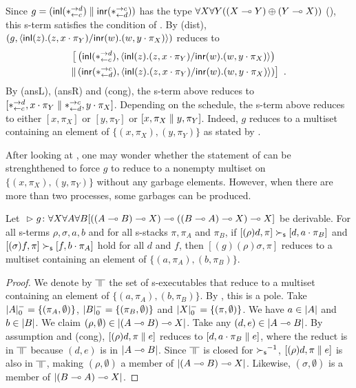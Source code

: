 \begin{example}
 \label{spec-ex}
 Since $g = (\mathsf{inl}({\ast^{\rightarrow {d}}_{\leftarrow{c}}})\parallel\mathsf{inr}({\ast^{\rightarrow {c}}_{\leftarrow{d}}}))$ has the type
 $\forall X\forall Y((X\multimap Y)\oplus (Y\multimap X))$ (),
 this s-term satisfies the condition of .
 By (dist),
 $\left(g, \langle \mathsf{inl}({z}). ({z},{x\cdot\pi_Y})/ \mathsf{inr}({w}). ({w},{y\cdot\pi_X})\rangle\right)$
 reduces to
 \begin{align*}
  \bigl[& \left(\mathsf{inl}({\ast^{\rightarrow {d}}_{\leftarrow{c}}}),
  \langle \mathsf{inl}({z}). ({z},{x\cdot\pi_Y})/ \mathsf{inr}({w}). ({w},{y\cdot\pi_X})\rangle\right) \\ \parallel
  & \left(\mathsf{inr}({\ast^{\rightarrow {c}}_{\leftarrow{d}}}), \langle \mathsf{inl}({z}). ({z},{x\cdot\pi_Y})/ \mathsf{inr}({w}). ({w},{y\cdot\pi_X})\rangle\right)\bigr]\enspace.
 \end{align*}
 By (ansL), (ansR) and (cong), the s-term above reduces to
 $[\ast^{\rightarrow {d}}_{\leftarrow{c}}, x\cdot\pi_Y\parallel \ast^{\rightarrow {c}}_{\leftarrow{d}},y\cdot\pi_X]$.
 Depending on the schedule,  the s-term above reduces to either
 $[x,\pi_X]$ or $[y,\pi_Y]$ or $[x,\pi_X\parallel y,\pi_Y]$.
 Indeed, $g$ reduces to a multiset containing an element of
 $\{(x,\pi_X), (y,\pi_Y)\}$ as stated by .
\end{example}

After looking at ,
one may wonder whether the statement of  can be
strenghthened to force $g$ to reduce to a nonempty multiset on
$\{(x,\pi_X), (y,\pi_Y)\}$ without any garbage elements.
However, when there are more than two processes, some garbages can be
produced.

\begin{proposition}
 \label{prop:spec}
 Let
 ${}\vartriangleright{}{ {g} \colon{\forall X\forall A\forall B
 [((A\multimap B)\multimap X)
  \multimap((B\multimap A)\multimap X)
  \multimap X]} }$
 be
 derivable.
 For all s-terms $\rho,\sigma, a,b$ and for all s-stacks $\pi, \pi_A$ and
 $\pi_B$,
 if $[(\rho)d  ,\pi]\succ_{\mathsf s} [d,a\cdot \pi_B]$ and
    $[(\sigma)f,\pi]\succ_{\mathsf s} [f,b\cdot \pi_A]$ hold for all $d$ and $f$,
 then
 $[(g)(\rho)\sigma,\pi]$ reduces to a multiset containing an
 element of
 $\{(a,\pi_A),(b,\pi_B)\}$.
\end{proposition}
\begin{proof}
 We denote by $\bbot$ the set of s-executables that reduce to a multiset
 containing an element of $\{(a,\pi_A), (b,\pi_B)\}$.
 By ,
 this is a pole.
 Take $|{A}|^-_0 =\{(\pi_A,\emptyset)\}$, $|{B}|^-_0 =
 \{(\pi_B,\emptyset)\}$ and $|{X}|^-_0=\{(\pi,\emptyset)\}$.
 We have $a\in|{A}|$ and $b\in|{B}|$.
 We claim $(\rho,\emptyset)\in|{(A\multimap B)\multimap X}|$.
 Take any $(d,e)\in|{A\multimap B}|$.
 By assumption and (cong),
 $[(\rho)d,\pi\parallel e]$ reduces to $[d,a\cdot\pi_B\parallel e]$,
 where the reduct is in $\bbot$ because $(d,e)$ is in $|{A\multimap B}|$.
 Since $\bbot$ is closed for ${\succ_{\mathsf s}}^{-1}$,
 $[(\rho)d,\pi\parallel e]$ is also in $\bbot$, making
 $(\rho,\emptyset)$ a member of $|{(A\multimap B)\multimap X}|$.
 Likewise,
 $(\sigma,\emptyset)$ is a member of $|{(B\multimap A)\multimap X}|$.
\end{proof}


